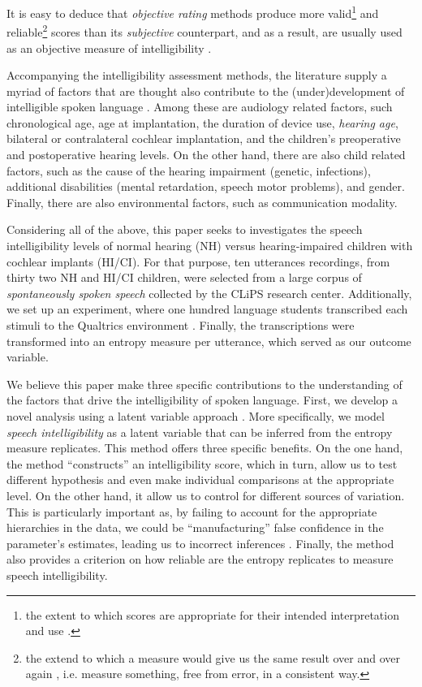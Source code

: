 It is easy to deduce that \textit{objective rating} methods produce more valid\footnote{the extent to which scores are appropriate for their intended interpretation and use \citep{Lesterhuis_2018, Trochim_2022}.} and reliable\footnote{the extend to which a measure would give us the same result over and over again \citep{Trochim_2022}, i.e. measure something, free from error, in a consistent way.} scores than its \textit{subjective} counterpart, and as a result, are usually used as an objective measure of intelligibility \citep{Boonen_et_al_2021, Faes_et_al_2021}.

Accompanying the intelligibility assessment methods, the literature supply a myriad of factors that are thought also contribute to the (under)development of intelligible spoken language \cite{Niparko_et_al_2010, Boons_et_al_2012, Gillis_2018, Fagan_et_al_2020}. Among these are audiology related factors, such chronological age, age at implantation, the duration of device use, \textit{hearing age}, bilateral or contralateral cochlear implantation, and the children's preoperative and postoperative hearing levels. On the other hand, there are also child related factors, such as the cause of the hearing impairment (genetic, infections), additional disabilities (mental retardation, speech motor problems), and gender. Finally, there are also environmental factors, such as communication modality. 

Considering all of the above, this paper seeks to investigates the speech intelligibility levels of normal hearing (NH) versus hearing-impaired children with cochlear implants (HI/CI). For that purpose, ten utterances recordings, from thirty two NH and HI/CI children, were selected from a large corpus of \textit{spontaneously spoken speech} collected by the CLiPS research center. Additionally, we set up an experiment, where one hundred language students transcribed each stimuli to the Qualtrics environment \cite{Qualtrics_2005}. Finally, the transcriptions were transformed into an entropy measure per utterance, which served as our outcome variable.

We believe this paper make three specific contributions to the understanding of the factors that drive the intelligibility of spoken language. First, we develop a novel analysis using a latent variable approach \cite{Everitt_1984}. More specifically, we model \textit{speech intelligibility} as a latent variable that can be inferred from the entropy measure replicates. This method offers three specific benefits. On the one hand, the method ``constructs'' an intelligibility score, which in turn, allow us to test different hypothesis and even make individual comparisons at the appropriate level. On the other hand, it allow us to control for different sources of variation. This is particularly important as, by failing to account for the appropriate hierarchies in the data, we could be ``manufacturing'' false confidence in the parameter's estimates, leading us to incorrect inferences \cite{McElreath_2020}. Finally, the method also provides a criterion on how reliable are the entropy replicates to measure speech intelligibility.

